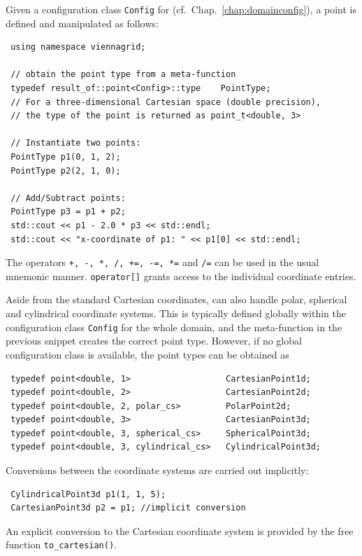 Given a configuration class \lstinline|Config| for {\ViennaGrid} (cf.~Chap.~\ref{chap:domainconfig}), a point is defined and manipulated as follows:
\begin{lstlisting}
 using namespace viennagrid;

 // obtain the point type from a meta-function
 typedef result_of::point<Config>::type    PointType;
 // For a three-dimensional Cartesian space (double precision),
 // the type of the point is returned as point_t<double, 3>

 // Instantiate two points:
 PointType p1(0, 1, 2);
 PointType p2(2, 1, 0);

 // Add/Subtract points:
 PointType p3 = p1 + p2;
 std::cout << p1 - 2.0 * p3 << std::endl;
 std::cout << "x-coordinate of p1: " << p1[0] << std::endl;
\end{lstlisting}
The operators \lstinline|+, -, *, /, +=, -=, *=| and \lstinline|/=| can be used in the usual mnemonic manner. \lstinline|operator[]| grants access to the individual coordinate entries.

Aside from the standard Cartesian coordinates, {\ViennaGrid} can also handle polar, spherical and cylindrical coordinate systems.
This is typically defined globally within the configuration class \lstinline|Config| for the whole domain, and the meta-function in the previous snippet creates the correct point type. However, if no global configuration class is available, the point types can be obtained as
\begin{lstlisting}
 typedef point<double, 1>                   CartesianPoint1d;
 typedef point<double, 2>                   CartesianPoint2d;
 typedef point<double, 2, polar_cs>         PolarPoint2d;
 typedef point<double, 3>                   CartesianPoint3d;
 typedef point<double, 3, spherical_cs>     SphericalPoint3d;
 typedef point<double, 3, cylindrical_cs>   CylindricalPoint3d;
\end{lstlisting}
Conversions between the coordinate systems are carried out implicitly:
\begin{lstlisting}
 CylindricalPoint3d p1(1, 1, 5);
 CartesianPoint3d p2 = p1; //implicit conversion
\end{lstlisting}
An explicit conversion to the Cartesian coordinate system is provided by the free function \lstinline|to_cartesian()|.


